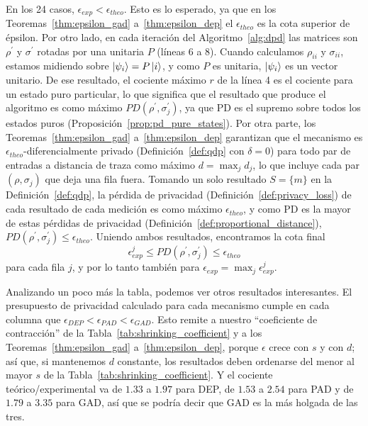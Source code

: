 \documentclass{ieeeaccess}
\begin{document}
En los 24 casos, $\epsilon_{exp} < \epsilon_{theo}$. Esto es lo esperado, ya que en los Teoremas~\ref{thm:epsilon_gad} a~\ref{thm:epsilon_dep} el $\epsilon_{theo}$ es la cota superior de épsilon. Por otro lado, en cada iteración del Algoritmo~\ref{alg:dpd} las matrices son $\rho^{\prime}$ y $\sigma^{\prime}$ rotadas por una unitaria $P$ (líneas 6 a 8). Cuando calculamos $\rho_{ii}$ y $\sigma_{ii}$, estamos midiendo sobre $\ket{\psi_i} = P\ket{i}$, y como $P$ es unitaria, $\ket{\psi_i}$ es un vector unitario. De ese resultado, el cociente máximo $r$ de la línea 4 es el cociente para un estado puro particular, lo que significa que el resultado que produce el algoritmo es como máximo $PD(\rho^{\prime}, \sigma_{j}^{\prime})$, ya que PD es el supremo sobre todos los estados puros (Proposición~\ref{prop:pd_pure_states}). Por otra parte, los Teoremas~\ref{thm:epsilon_gad} a~\ref{thm:epsilon_dep} garantizan que el mecanismo es $\epsilon_{theo}$-diferencialmente privado (Definición~\ref{def:qdp} con $\delta = 0$) para todo par de entradas a distancia de traza como máximo $d = \max_j d_j$, lo que incluye cada par $(\rho, \sigma_j)$ que deja una fila fuera. Tomando un solo resultado $S = \{m\}$ en la Definición~\ref{def:qdp}, la pérdida de privacidad (Definición~\ref{def:privacy_loss}) de cada resultado de cada medición es como máximo $\epsilon_{theo}$, y como PD es la mayor de estas pérdidas de privacidad (Definición~\ref{def:proportional_distance}), $PD(\rho^{\prime}, \sigma_{j}^{\prime}) \leq \epsilon_{theo}$. Uniendo ambos resultados, encontramos la cota final
\begin{equation}
  \epsilon_{exp}^{j} \leq PD(\rho^{\prime}, \sigma_{j}^{\prime}) \leq \epsilon_{theo}
  \label{eq:final_bound}
\end{equation}
para cada fila $j$, y por lo tanto también para $\epsilon_{exp} = \max_j \epsilon_{exp}^{j}$.

Analizando un poco más la tabla, podemos ver otros resultados interesantes. El presupuesto de privacidad calculado para cada mecanismo cumple en cada columna que $\epsilon_{DEP} < \epsilon_{PAD} < \epsilon_{GAD}$. Esto remite a nuestro ``coeficiente de contracción'' de la Tabla~\ref{tab:shrinking_coefficient} y a los Teoremas~\ref{thm:epsilon_gad} a~\ref{thm:epsilon_dep}, porque $\epsilon$ crece con $s$ y con $d$; así que, si mantenemos $d$ constante, los resultados deben ordenarse del menor al mayor $s$ de la Tabla~\ref{tab:shrinking_coefficient}. Y el cociente teórico/experimental va de $1.33$ a $1.97$ para DEP, de $1.53$ a $2.54$ para PAD y de $1.79$ a $3.35$ para GAD, así que se podría decir que GAD es la más holgada de las tres.
\end{document}
